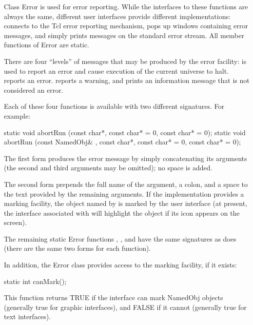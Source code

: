 Class Error is used for error reporting.  While the interfaces to
these functions are always the same, different user interfaces provide
different implementations:  connects to the Tcl error
reporting mechanism,  pops up windows containing error
messages, and  simply prints messages on the standard
error stream.  All member functions of Error are static.

There are four ``levels'' of messages that may be produced by the error
facility:  is used to report an error and cause execution
of the current universe to halt.
 reports an error.
 reports a warning, and  prints
an information message that is not considered an error.

Each of these four functions is available with two different signatures.
For example:

\begin{example}
static void abortRun (const char*, const char* = 0, const char* = 0);
static void abortRun (const NamedObj& , const char*, const char* = 0,
                      const char* = 0);
\end{example}

The first form produces the error message by simply concatenating its
arguments (the second and third arguments may be omitted); no space is
added.

The second form prepends the full name of the  argument, a
colon, and a space to the text provided by the remaining arguments.
If the implementation provides a marking facility, the object named
by  is marked by the user interface (at present, the interface
associated with  will highlight the object if its icon
appears on the screen).

The remaining static Error functions , , and
 have the same signatures as does  (there
are the same two forms for each function).

In addition, the Error class provides access to the marking facility,
if it exists:

\begin{example}
static int canMark();
\end{example}

This function returns TRUE if the interface can mark NamedObj objects
(generally true for graphic interfaces), and FALSE if it cannot
(generally true for text interfaces).

